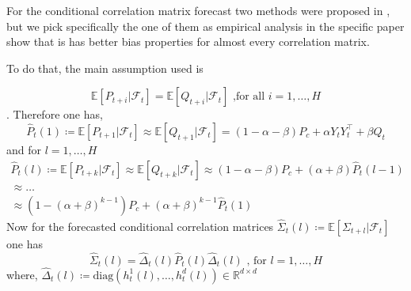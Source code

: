 \documentclass[a4paper, oneside]{discothesis}
\begin{document}
For the conditional correlation matrix forecast two methods were proposed in \cite{DCC_Forecast}, but we pick specifically the one of them as empirical analysis in the specific paper show that is has better bias properties for almost every correlation matrix.

To do that, the main assumption used is

 \[\mathbb{E}[P_{t+i}|\mathcal{F}_t]=\mathbb{E}[Q_{t+i}|\mathcal{F}_t] \text{ ,for all } i=1, \dots, H\]. Therefore one has,
\begin{equation}
    \hat{P}_t(1)\coloneqq\mathbb{E}[P_{t+1}|\mathcal{F}_{t}]\approx\mathbb{E}[Q_{t+1}|\mathcal{F}_t]=(1-\alpha-\beta)P_c+\alpha Y_t Y_t^\intercal+\beta Q_t
\end{equation}
and for $l = 1, \dots, H$
\begin{equation}
    \begin{split}
        \hat{P}_t(l)\coloneqq\mathbb{E}[P_{t+k}|\mathcal{F}_t]\approx\mathbb{E}[Q_{t+k}|\mathcal{F}_t]\approx (1-\alpha-\beta)P_c+(\alpha+\beta)\hat{P}_t(l-1)\\\approx  \dots \\ \approx (1-(\alpha+\beta)^{k-1})P_c+(\alpha+\beta)^{k-1}\hat{P}_t(1)
    \end{split}
\end{equation}
Now for the forecasted conditional correlation matrices $\hat{\Sigma}_t(l)\coloneqq\mathbb{E}[\Sigma_{t+l}|\mathcal{F}_{t}]$ one has
\begin{equation}
    \hat{\Sigma}_t(l) = \hat{\Delta}_t(l)\hat{P}_t(l)\hat{\Delta}_t(l)\text{ , for } l = 1, \dots, H
\end{equation}
where, $\hat{\Delta}_t(l)\coloneqq\text{diag}(h^1_t(l),\dots, h^d_t(l))\in\mathbb{R}^{d\times d}$
\end{document}
